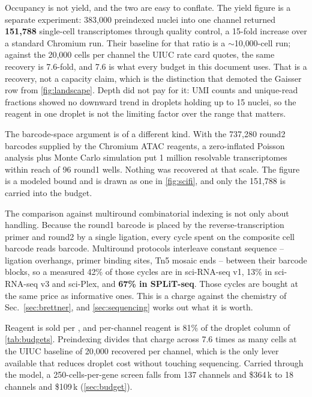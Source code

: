  Occupancy is not yield, and the two are
easy to conflate. The yield figure is a separate experiment: 383{,}000 preindexed
nuclei into one channel returned \textbf{151{,}788} single-cell transcriptomes
through quality control, a 15-fold increase over a standard Chromium run. Their
baseline for that ratio is a $\sim$10{,}000-cell run; against the 20{,}000 cells
per channel the UIUC rate card quotes, the same recovery is 7.6-fold, and 7.6 is
what every budget in this document uses. That is
a recovery, not a capacity claim, which is the distinction that demoted the
Gaisser row from \cref{fig:landscape}. Depth did not pay for it: UMI counts and
unique-read fractions showed no downward trend in droplets holding up to 15
nuclei, so the reagent in one droplet is not the limiting factor over the range
that matters.

 The barcode-space argument is
of a different kind. With the 737{,}280 round2 barcodes supplied by the Chromium
ATAC reagents, a zero-inflated Poisson analysis plus Monte Carlo simulation put 1
million resolvable transcriptomes within reach of 96 round1 wells. Nothing was
recovered at that scale. The figure is a modeled bound and is drawn as one in
\cref{fig:scifi}, and only the 151{,}788 is carried into the budget.

 The comparison against
multiround combinatorial indexing is not only about handling. Because the round1
barcode is placed by the reverse-transcription primer and round2 by a single
ligation, every cycle spent on the composite cell barcode reads barcode. Multiround
protocols interleave constant sequence -- ligation overhangs, primer binding sites,
Tn5 mosaic ends -- between their barcode blocks, so a measured 42\% of those cycles
are  in sci-RNA-seq v1, 13\% in sci-RNA-seq v3 and sci-Plex,
and \textbf{67\% in SPLiT-seq}. Those cycles are bought at the same price as
informative ones. This is a charge against the chemistry of
Sec.~\ref{sec:brettner}, and \cref{sec:sequencing} works out what it is worth.

 Reagent is
sold per , and per-channel reagent is 81\% of the droplet column of
\cref{tab:budgets}. Preindexing divides that charge across 7.6 times as many
cells at the UIUC baseline of 20{,}000 recovered per channel, which is the only
lever available that reduces droplet cost without touching sequencing. Carried
through the model, a 250-cells-per-gene screen falls from 137 channels and
\$364\,k to 18 channels and \$109\,k (\cref{sec:budget}).

